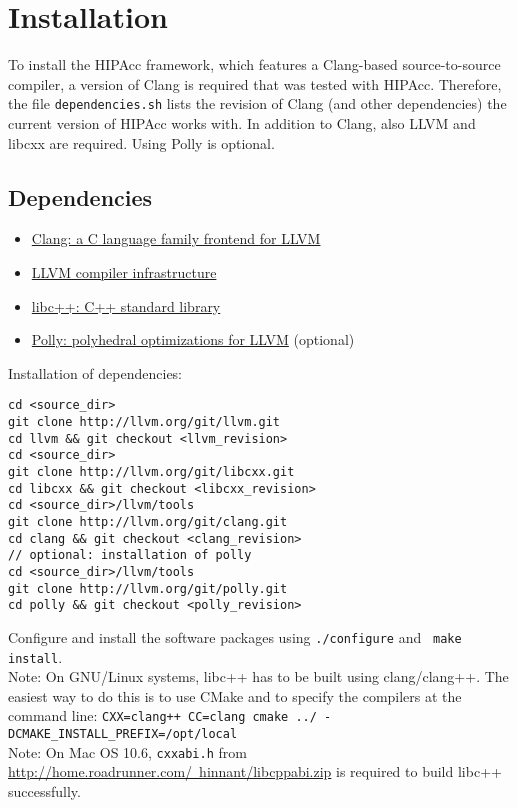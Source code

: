 \section{Installation}
To install the \ac{HIPAcc} framework, which features a Clang-based source-to-source
compiler, a version of Clang is required that was tested with \ac{HIPAcc}.
Therefore, the file {\tt dependencies.sh} lists the revision of Clang (and other
dependencies) the current version of \ac{HIPAcc} works with. In addition to Clang,
also LLVM and libcxx are required. Using Polly is optional.


\subsection{Dependencies}
\begin{itemize}
    \item \href{http://clang.llvm.org}{Clang: a C language family frontend for LLVM}
    \item \href{http://llvm.org}{LLVM compiler infrastructure}
    \item \href{http://libcxx.llvm.org}{libc++: C++ standard library}
    \item \href{http://polly.llvm.org}{Polly: polyhedral optimizations for LLVM} (optional)
\end{itemize}

Installation of dependencies:
\begin{lstlisting}
cd <source_dir>
git clone http://llvm.org/git/llvm.git
cd llvm && git checkout <llvm_revision>
cd <source_dir>
git clone http://llvm.org/git/libcxx.git
cd libcxx && git checkout <libcxx_revision>
cd <source_dir>/llvm/tools
git clone http://llvm.org/git/clang.git
cd clang && git checkout <clang_revision>
// optional: installation of polly
cd <source_dir>/llvm/tools
git clone http://llvm.org/git/polly.git
cd polly && git checkout <polly_revision>
\end{lstlisting}
Configure and install the software packages using {\tt ./configure} and {\tt
make install}.\\
Note: On GNU/Linux systems, libc++ has to be built using clang/clang++. The
easiest way to do this is to use CMake and to specify the compilers at the command
line: \verb|CXX=clang++ CC=clang cmake ../ -DCMAKE_INSTALL_PREFIX=/opt/local| \\
Note: On Mac OS 10.6, {\tt cxxabi.h} from
\href{http://home.roadrunner.com/~hinnant/libcppabi.zip}{http://home.roadrunner.com/~hinnant/libcppabi.zip}
is required to build libc++ successfully.


